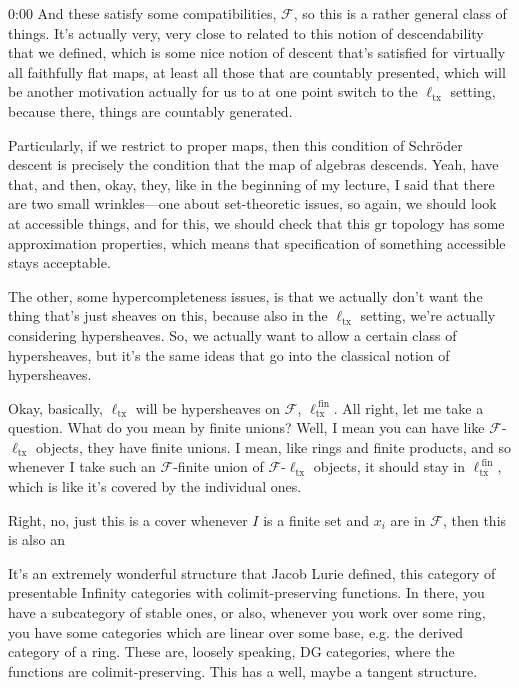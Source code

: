 \begin{unfinished}{0:00}
And these satisfy some compatibilities, $\mathcal{F}$, so this is a rather general class of things. It's actually very, very close to related to this notion of descendability that we defined, which is some nice notion of descent that's satisfied for virtually all faithfully flat maps, at least all those that are countably presented, which will be another motivation actually for us to at one point switch to the $\mathrm{\ell}_{\mathrm{tx}}$ setting, because there, things are countably generated.

Particularly, if we restrict to proper maps, then this condition of Schröder descent is precisely the condition that the map of algebras descends. Yeah, have that, and then, okay, they, like in the beginning of my lecture, I said that there are two small wrinkles---one about set-theoretic issues, so again, we should look at accessible things, and for this, we should check that this $\mathrm{gr}$ topology has some approximation properties, which means that specification of something accessible stays acceptable.

The other, some hypercompleteness issues, is that we actually don't want the thing that's just sheaves on this, because also in the $\mathrm{\ell}_{\mathrm{tx}}$ setting, we're actually considering hypersheaves. So, we actually want to allow a certain class of hypersheaves, but it's the same ideas that go into the classical notion of hypersheaves.

Okay, basically, $\mathrm{\ell}_{\mathrm{tx}}$ will be hypersheaves on $\mathcal{F}$, $\mathrm{\ell}_{\mathrm{tx}}^{\ \mathrm{fin}}$. All right, let me take a question. What do you mean by finite unions? Well, I mean you can have like $\mathcal{F}$-$\mathrm{\ell}_{\mathrm{tx}}$ objects, they have finite unions. I mean, like rings and finite products, and so whenever I take such an $\mathcal{F}$-finite union of $\mathcal{F}$-$\mathrm{\ell}_{\mathrm{tx}}$ objects, it should stay in $\mathrm{\ell}_{\mathrm{tx}}^{\ \mathrm{fin}}$, which is like it's covered by the individual ones.

Right, no, just this is a cover whenever $I$ is a finite set and $x_i$ are in $\mathcal{F}$, then this is also an 

It's an extremely wonderful structure that Jacob Lurie defined, this category of presentable Infinity categories with colimit-preserving functions. In there, you have a subcategory of stable ones, or also, whenever you work over some ring, you have some categories which are linear over some base, e.g. the derived category of a ring. These are, loosely speaking, DG categories, where the functions are colimit-preserving. This has a well, maybe a tangent structure. 


\end{unfinished}
